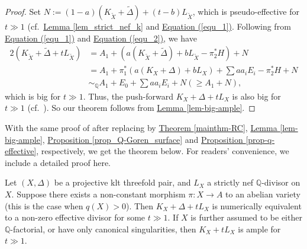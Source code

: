 \begin{proof}
Set $N:=(1-a)(K_{\widetilde{X}}+\widetilde{\Delta})+(t-b)L_{\widetilde{X}}$, which is pseudo-effective for $t\gg 1$ (cf.~{\hyperref[lem_strict_nef_k]{Lemma  \ref*{lem_strict_nef_k}}} and {\hyperref[equ_1]{Equation  (\ref*{equ_1})}}.
Following from {\hyperref[equ_1]{Equation  (\ref*{equ_1})}} and {\hyperref[equ_2]{Equation  (\ref*{equ_2})}}, we have
\begin{align*}
2(K_{\widetilde{X}}+\widetilde{\Delta}+tL_{\widetilde{X}})&=A_1+(a(K_{\widetilde{X}}+\widetilde{\Delta})+bL_{\widetilde{X}}-\pi_2^*H)+N\\
&=
A_1+\pi_1^*(a(K_X+\Delta)+bL_X)+\sum aa_iE_i-\pi_2^*H+N\\
&\sim_{\mathbb{Q}} A_1+E_0+\sum aa_iE_i+N(\ge A_1+N),
\end{align*}
which is big for $t\gg 1$.
Thus, the push-forward $K_X+\Delta+tL_X$ is also big for $t\gg1$ (cf.~\cite[Lemma 4.10(i\!i\!i) and its proof]{FKL16}).
So our theorem follows from {\hyperref[lem-big-ample]{Lemma  \ref*{lem-big-ample}}}.
\end{proof}



With  the same proof of \cite[Theorem 3.1]{CCP08}  after replacing \cite[Theorem 0.3, Lemma 1.5, Propositions 1.7, 1.8]{CCP08} by 
{\hyperref[mainthm-RC]{Theorem \ref*{mainthm-RC}}}, {\hyperref[lem-big-ample]{Lemma  \ref*{lem-big-ample}}},  {\hyperref[prop_Q-Goren_surface]{Proposition  \ref*{prop_Q-Goren_surface}}} and {\hyperref[prop-q-effective]{Proposition  \ref*{prop-q-effective}}}, respectively, we  get the theorem below.   
For readers' convenience, we  include a detailed proof here. 
\begin{thm}\label{thm_alb}
Let $(X,\Delta)$ be a   projective klt threefold pair, and $L_X$ a  strictly nef $\mathbb{Q}$-divisor on $X$.
Suppose there exists a non-constant morphism $\pi:X\to A$ to an abelian variety (this is the case when $q(X)>0$).
Then $K_X+\Delta+tL_X$ is numerically equivalent to a non-zero effective divisor for  some $t\gg 1$. 
If $X$ is further assumed to be either $\mathbb{Q}$-factorial, or have only canonical singularities, 
then $K_X+tL_X$ is ample for $t\gg 1$.
\end{thm}

